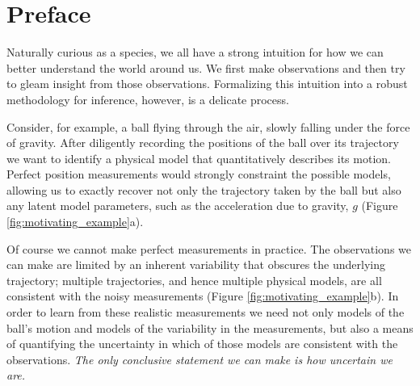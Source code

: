 \chapter*{Preface}

Naturally curious as a species, we all have a strong intuition
for how we can better understand the world around us.  We
first make observations and then try to gleam insight from 
those observations.  Formalizing this intuition into a robust
methodology for inference, however, is a delicate process.

Consider, for example, a ball flying through the air, slowly 
falling under the force of gravity.  After diligently recording the 
positions of the ball over its trajectory we want to identify a 
physical model that quantitatively describes its motion.  Perfect
position measurements would strongly constraint the possible
models, allowing us to exactly recover not only the trajectory 
taken by the ball but also any latent model parameters, such as 
the acceleration due to gravity, $g$ (Figure \ref{fig:motivating_example}a).  

Of course we cannot make perfect measurements in practice.
The observations we can make are limited by an inherent variability 
that obscures the underlying trajectory; multiple trajectories, and
hence multiple physical models, are all consistent with the noisy
measurements (Figure \ref{fig:motivating_example}b).  In order
to learn from these realistic measurements we need not only 
models of the ball's motion and models of the variability in the
measurements, but also a means of quantifying the uncertainty
in which of those models are consistent with the observations.
\emph{The only conclusive statement we can make is how uncertain 
we are.}

